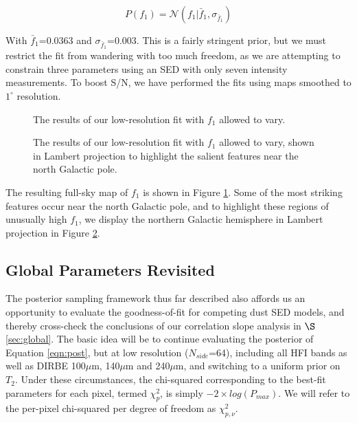 \documentclass{emulateapj}
\begin{document}
\begin{equation} \label{equ:f1prior}
P(f_1) = \mathcal{N}(f_1|\bar{f}_1, \sigma_{\bar{f}_1})
\end{equation}

With $\bar{f}_1$=0.0363 and $\sigma_{\bar{f}_1}$=0.003. This is a fairly
stringent prior, but we must restrict the fit from wandering with too much
freedom, as we are attempting to constrain three parameters using an SED
with only seven intensity measurements. To boost S/N, we have performed
the fits using maps smoothed to $1^{\circ}$ resolution.

\begin{figure}
\begin{center}
\caption{\label{fig:f1} The results of our low-resolution fit with $f_1$
allowed to vary.}
\end{center}
\end{figure}

\begin{figure}
\begin{center}
\caption{\label{fig:f1lambert} The results of our low-resolution fit with $f_1$
allowed to vary, shown in Lambert projection to highlight the salient features 
near the north Galactic pole.}
\end{center}
\end{figure}

The resulting full-sky map of $f_1$ is shown in Figure \ref{fig:f1}. Some of 
the most striking features occur near the north Galactic pole, and to 
highlight these regions of unusually high $f_1$, we display the northern
Galactic hemisphere in Lambert projection in Figure \ref{fig:f1lambert}.
 

\subsection{Global Parameters Revisited}
\label{sec:hier}

The posterior sampling framework thus far described also affords us an
opportunity to evaluate the goodness-of-fit for competing dust SED models, and 
thereby cross-check the conclusions of our correlation slope analysis in
$\S$\ref{sec:global}. The basic idea will be to continue evaluating the 
posterior of Equation \ref{eqn:post}, but at low resolution ($N_{side}$=64), 
including all HFI bands as well as DIRBE 100$\mu$m, 140$\mu$m and 240$\mu$m, 
and switching to a uniform prior on $T_2$. Under these circumstances, the 
chi-squared corresponding to the best-fit parameters for each pixel, termed 
$\chi^2_p$, is simply $-2 \times log(P_{max})$. We will refer to the
per-pixel chi-squared per degree of freedom as $\chi^2_{p, \nu}$.
\end{document}
